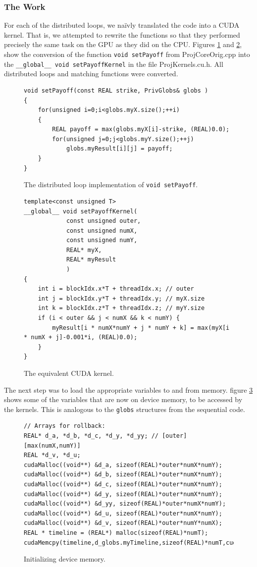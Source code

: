\documentclass[12pt, oneside]{article}
\begin{document}
\subsubsection{The Work}
For each of the distributed loops, we na\"ivly translated the code into a CUDA kernel. That is, we attempted to rewrite the functions so that they performed precisely the same task on the GPU as they did on the CPU. Figures \ref{fig:nokernel} and \ref{fig:yeskernel}, show the conversion of the function \texttt{void setPayoff} from ProjCoreOrig.cpp into the \texttt{\_\_global\_\_ void setPayoffKernel} in the file ProjKernels.cu.h. All distributed loops and matching functions were converted.
\begin{figure}[h]
	\begin{lstlisting}
void setPayoff(const REAL strike, PrivGlobs& globs )
{
	for(unsigned i=0;i<globs.myX.size();++i)
	{
		REAL payoff = max(globs.myX[i]-strike, (REAL)0.0);
		for(unsigned j=0;j<globs.myY.size();++j)
			globs.myResult[i][j] = payoff;
	}
}
\end{lstlisting}
\caption{ \label{fig:nokernel} The distributed loop implementation of \texttt{void setPayoff}.}
\end{figure}
\begin{figure}[h]
\begin{lstlisting}
template<const unsigned T>
__global__ void setPayoffKernel(
			const unsigned outer,
			const unsigned numX,
			const unsigned numY,
			REAL* myX,
			REAL* myResult
			)
{
	int i = blockIdx.x*T + threadIdx.x; // outer
	int j = blockIdx.y*T + threadIdx.y; // myX.size
	int k = blockIdx.z*T + threadIdx.z; // myY.size
	if (i < outer && j < numX && k < numY) {
		myResult[i * numX*numY + j * numY + k] = max(myX[i * numX + j]-0.001*i, (REAL)0.0);
	}
}
\end{lstlisting}
\caption{ \label{fig:yeskernel} The equivalent CUDA kernel.}
\end{figure}
					
The next step was to load the appropriate variables to and from memory. figure \ref{fig:cudamemcopy} shows some of the variables that are now on device memory, to be accessed by the kernels. This is analogous to the \texttt{globs} structures from the sequential code.
					
\begin{figure}[h]
\begin{lstlisting}
// Arrays for rollback:
REAL* d_a, *d_b, *d_c, *d_y, *d_yy; // [outer][max(numX,numY)]
REAL *d_v, *d_u;
cudaMalloc((void**) &d_a, sizeof(REAL)*outer*numX*numY);
cudaMalloc((void**) &d_b, sizeof(REAL)*outer*numX*numY);
cudaMalloc((void**) &d_c, sizeof(REAL)*outer*numX*numY);
cudaMalloc((void**) &d_y, sizeof(REAL)*outer*numX*numY);
cudaMalloc((void**) &d_yy, sizeof(REAL)*outer*numX*numY);
cudaMalloc((void**) &d_u, sizeof(REAL)*outer*numX*numY);
cudaMalloc((void**) &d_v, sizeof(REAL)*outer*numY*numX);
REAL * timeline = (REAL*) malloc(sizeof(REAL)*numT);
cudaMemcpy(timeline,d_globs.myTimeline,sizeof(REAL)*numT,cudaMemcpyDeviceToHost);
\end{lstlisting}
\caption{ \label{fig:cudamemcopy} Initializing device memory.}
\end{figure}
						
\end{document}
